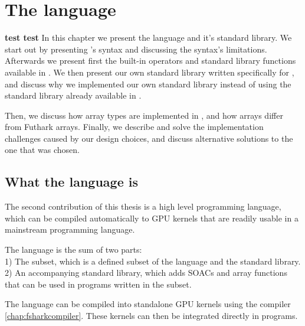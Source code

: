 \chapter{The \fshark{} language}
\textbf{test test}
In this chapter we present the \fshark{} language and it's standard library.
We start out by presenting \fshark{}'s syntax and discussing the syntax's
limitations.
Afterwards we present first the built-in \fsharp{} operators and \fsharp{}
standard library functions available in \fshark{}.
We then present our own standard library written specifically for \fshark{}, and
discuss why we implemented our own standard library instead of using the
standard library already available in \fsharp{}.

Then, we discuss how array types are implemented in \fshark{}, and how
\fsharp{} arrays differ from Futhark arrays.
Finally, we describe and solve the implementation challenges caused by our
design choices, and discuss alternative solutions to the one that was chosen.

\section{What the \fshark{} language is}
\label{chap:fsharklanguage}
The second contribution of this thesis is a high level programming language,
which can be compiled automatically to GPU kernels that are readily usable in
a mainstream programming language.

The \fshark{} language is the sum of two parts: \\
1) The \fshark{} subset, which is a defined subset of the \fsharp{} language and
the \fsharp{} standard library.\\
2) An accompanying standard library, which adds SOACs and array functions that
can be used in programs written in the \fshark{} subset.

The \fshark{} language can be compiled into standalone GPU kernels using the
\fshark{} compiler \ref{chap:fsharkcompiler}. These kernels can then be integrated directly in
\fsharp{} programs.

